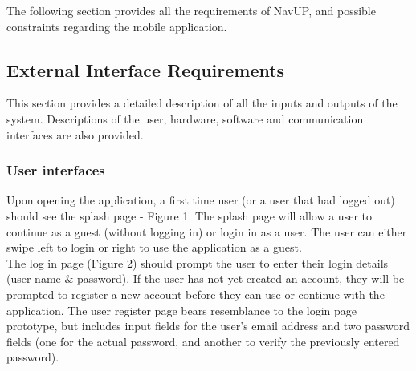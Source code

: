 \documentclass{article}
\begin{document}
	The following section provides all the requirements of NavUP, and possible constraints regarding the mobile application.
			\subsection{External Interface Requirements}\label{subsec:external}
			This section provides a detailed description of all the inputs and outputs of the system. Descriptions of the user, hardware, software and communication interfaces are also provided.
			\subsubsection{User interfaces}
			Upon opening the application, a first time user (or a user that had logged out) should see the splash page - Figure 1. The splash page will allow a user to continue as a guest (without logging in) or login in as a user. The user can either swipe left to login or right to use the application as a guest. \\
			
			The log in page (Figure 2) should prompt the user to enter their login details (user name \& password). If the user has not yet created an account, they will be prompted to register a new account before they can use or continue with the application. The user register page bears resemblance to the login page prototype, but includes input fields for the user's email address and two password fields (one for the actual password, and another to verify the previously entered password). \\
			
\end{document}
